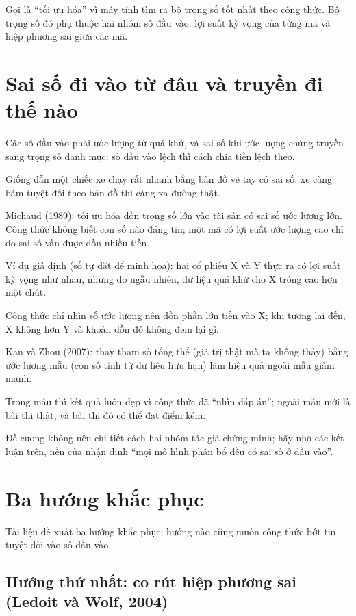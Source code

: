 Gọi là “tối ưu hóa” vì máy tính tìm ra bộ trọng số tốt nhất theo công thức. Bộ trọng số đó phụ thuộc hai nhóm số đầu vào: lợi suất kỳ vọng của từng mã và hiệp phương sai giữa các mã.

\section{Sai số đi vào từ đâu và truyền đi thế nào}

Các số đầu vào phải ước lượng từ quá khứ, và sai số khi ước lượng chúng truyền sang trọng số danh mục: số đầu vào lệch thì cách chia tiền lệch theo.

Giống dẫn một chiếc xe chạy rất nhanh bằng bản đồ vẽ tay có sai số: xe càng bám tuyệt đối theo bản đồ thì càng xa đường thật.

Michaud (1989): tối ưu hóa dồn trọng số lớn vào tài sản có sai số ước lượng lớn. Công thức không biết con số nào đáng tin; một mã có lợi suất ước lượng cao chỉ do sai số vẫn được dồn nhiều tiền.

\begin{tcolorbox}[breakable]
Ví dụ giả định (số tự đặt để minh họa): hai cổ phiếu X và Y thực ra có lợi suất kỳ vọng như nhau, nhưng do ngẫu nhiên, dữ liệu quá khứ cho X trông cao hơn một chút.

Công thức chỉ nhìn số ước lượng nên dồn phần lớn tiền vào X; khi tương lai đến, X không hơn Y và khoản dồn đó không đem lại gì.
\end{tcolorbox}

Kan và Zhou (2007): thay tham số tổng thể (giá trị thật mà ta không thấy) bằng ước lượng mẫu (con số tính từ dữ liệu hữu hạn) làm hiệu quả ngoài mẫu giảm mạnh.

Trong mẫu thì kết quả luôn đẹp vì công thức đã “nhìn đáp án”; ngoài mẫu mới là bài thi thật, và bài thi đó có thể đạt điểm kém.

Đề cương không nêu chi tiết cách hai nhóm tác giả chứng minh; hãy nhớ các kết luận trên, nền của nhận định “mọi mô hình phân bổ đều có sai số ở đầu vào”.

\section{Ba hướng khắc phục}

Tài liệu đề xuất ba hướng khắc phục; hướng nào cũng muốn công thức bớt tin tuyệt đối vào số đầu vào.

\subsection{Hướng thứ nhất: co rút hiệp phương sai (Ledoit và Wolf, 2004)}

